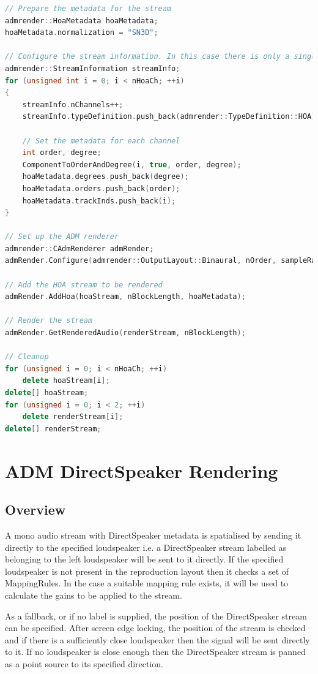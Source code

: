\documentclass[12pt]{report}
\begin{document}
\begin{lstlisting}[language=C++]
// Prepare the metadata for the stream
admrender::HoaMetadata hoaMetadata;
hoaMetadata.normalization = "SN3D";

// Configure the stream information. In this case there is only a single HOA stream of (nOrder + 1)^2 channels
admrender::StreamInformation streamInfo;
for (unsigned int i = 0; i < nHoaCh; ++i)
{
    streamInfo.nChannels++;
    streamInfo.typeDefinition.push_back(admrender::TypeDefinition::HOA);

    // Set the metadata for each channel
    int order, degree;
    ComponentToOrderAndDegree(i, true, order, degree);
    hoaMetadata.degrees.push_back(degree);
    hoaMetadata.orders.push_back(order);
    hoaMetadata.trackInds.push_back(i);
}

// Set up the ADM renderer
admrender::CAdmRenderer admRender;
admRender.Configure(admrender::OutputLayout::Binaural, nOrder, sampleRate, nBlockLength, streamInfo);

// Add the HOA stream to be rendered
admRender.AddHoa(hoaStream, nBlockLength, hoaMetadata);

// Render the stream
admRender.GetRenderedAudio(renderStream, nBlockLength);

// Cleanup
for (unsigned i = 0; i < nHoaCh; ++i)
    delete hoaStream[i];
delete[] hoaStream;
for (unsigned i = 0; i < 2; ++i)
    delete renderStream[i];
delete[] renderStream;
\end{lstlisting}

\section{ADM DirectSpeaker Rendering}\label{AdmDirectSpeaker}

\subsection{Overview}

A mono audio stream with DirectSpeaker metadata is spatialised by sending it directly to the specified loudspeaker i.e. a DirectSpeaker stream labelled as belonging to the left loudspeaker will be sent to it directly.
If the specified loudspeaker is not present in the reproduction layout then it checks a set of MappingRules.
In the case a suitable mapping rule exists, it will be used to calculate the gains to be applied to the stream.

As a fallback, or if no label is supplied, the position of the DirectSpeaker stream can be specified.
After screen edge locking, the position of the stream is checked and if there is a sufficiently close loudspeaker then the signal will be sent directly to it.
If no loudspeaker is close enough then the DirectSpeaker stream is panned as a point source to its specified direction.
\end{document}

